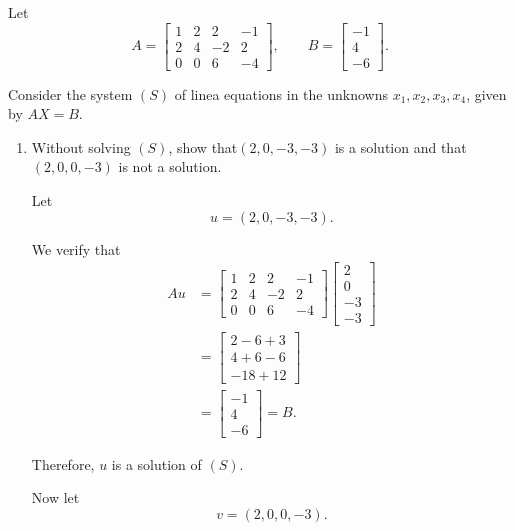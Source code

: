 
\item Let
$$
A=
\begin{bmatrix}
1&2&2&-1\\
2&4&-2&2\\
0&0&6&-4
\end{bmatrix},
\qquad
B=
\begin{bmatrix}
-1\\4\\-6
\end{bmatrix}.
$$

Consider the system $(S)$ of linea equations in the unknowns
$x_1,x_2,x_3,x_4$, given by $AX=B$.

\begin{enumerate}[label=\alph*)]

\item Without solving $(S)$, show that$(2,0,-3,-3)$ is a solution and that
$(2,0,0,-3)$ is not a solution.

\begin{answer}
    Let
    $$
    u=(2,0,-3,-3).
    $$

    We verify that
    $$
    \begin{aligned}
    Au
    &=
    \begin{bmatrix}
    1&2&2&-1\\
    2&4&-2&2\\
    0&0&6&-4
    \end{bmatrix}
    \begin{bmatrix}
    2\\0\\-3\\-3
    \end{bmatrix}\\[6pt]
    &=
    \begin{bmatrix}
    2-6+3\\
    4+6-6\\
    -18+12
    \end{bmatrix}\\[6pt]
    &=
    \begin{bmatrix}
    -1\\4\\-6
    \end{bmatrix}
    =B.
    \end{aligned}
    $$

    Therefore, $u$ is a solution of $(S)$.

    Now let
    $$
    v=(2,0,0,-3).
    $$


\end{answer}
\end{enumerate}
